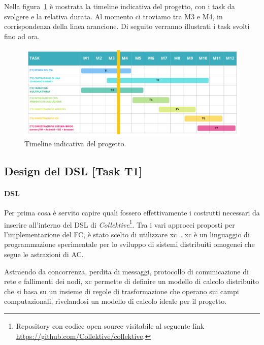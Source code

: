 \documentclass[13pt, a4paper]{article}
\newcommand{\ck}{\emph{Collektive}}
\begin{document}
Nella figura~\ref{fig:timeline} è mostrata la timeline indicativa del progetto, con i task da svolgere e la relativa durata.
%
Al momento ci troviamo tra M3 e M4, in corrispondenza della linea arancione.
%
Di seguito verranno illustrati i task svolti fino ad ora.

\begin{figure}
    \centering
    \includegraphics[width=\textwidth]{images/collektive_timeline}
    \caption{Timeline indicativa del progetto.}
    \label{fig:timeline}
\end{figure}

\subsection{Design del DSL [Task T1]}\label{subsec:t1}

\paragraph{DSL}
Per prima cosa è servito capire quali fossero effettivamente i costrutti necessari da inserire all'interno del DSL di \ck{}\footnote{
    Repository con codice open source visitabile al seguente link \url{https://github.com/Collektive/collektive}.
}.
%
Tra i vari approcci proposti per l'implementazione del \ac{FC}, è stato scelto di utilizzare \ac{xc}~\cite{AudritoCDSV24}.
%
\ac{xc} è un linguaggio di programmazione sperimentale per lo sviluppo di sistemi distribuiti omogenei che segue le astrazioni
    di \ac{AC}.

Astraendo da concorrenza, perdita di messaggi, protocollo di comunicazione di rete e fallimenti dei nodi,
    \ac{xc} permette di definire un modello di calcolo distribuito che si basa su un insieme di regole di trasformazione
    che operano sui campi computazionali,
    rivelandosi un modello di calcolo ideale per il progetto.
\end{document}
